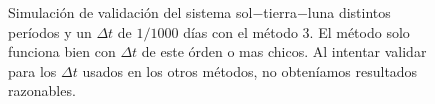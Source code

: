 \begin{figure}
{	\label{fig:ej1_m3_1825_1000}
	}
	\caption{
		Simulación de validación del sistema sol$-$tierra$-$luna distintos períodos y un $\Delta t$ de $1/1000$ días
		con el método 3. El método solo funciona bien con $\Delta t$ de este órden o mas chicos.
		Al intentar validar para los $\Delta t$ usados en los otros métodos, no obteníamos resultados razonables.
	}
	\label{ fig:res_ej1_m3 }
\end{figure}
